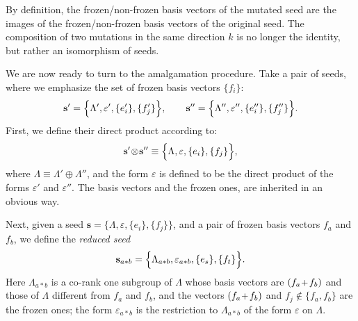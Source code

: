 \documentclass[12pt,hyperref,compress]{JHEP3}
\newcommand{\eq}[1]{\begin{equation}#1\end{equation}}
\newcommand{\pl}{\hspace{0.5pt}\text{{\small+}}\hspace{-0.5pt}}
\begin{document}
By definition, the frozen/non-frozen basis vectors of the mutated seed are the images of the  frozen/non-frozen basis vectors of the original seed. The composition of two mutations in the same direction $k$ is no longer the identity, but rather an isomorphism of seeds.

We are now ready to turn to the amalgamation procedure.
Take a pair of seeds, where we emphasize the set of frozen basis vectors $\{f_i\}$:
\vspace{-.2cm}\eq{{\mathbf s}' = \Big\{\Lambda', \varepsilon', \{e'_{i}\}, \{f'_{j}\}\Big\},\qquad{\mathbf s}'' = \Big\{\Lambda'', \varepsilon'', \{e''_{i}\}, \{f''_{j}\}\Big\}. \vspace{-.2cm} \label{thepair}}
First, we define their direct product according to:
\vspace{-.2cm}\eq{{\mathbf s}'\!\otimes\!{\mathbf s}''\equiv \Big\{\Lambda,\varepsilon, \{e_{i}\}, \{f_{j}\}\Big\},\vspace{-.2cm}}
where $\Lambda\!\equiv\!\Lambda'\!\oplus\!\Lambda''$, and the form $\varepsilon$ is defined to be the direct product of the forms $\varepsilon'$ and $\varepsilon''$. The basis vectors and the frozen ones, are inherited in an obvious way.

Next, given a seed ${\mathbf s} = \Big\{\Lambda,\varepsilon, \{e_{i}\}, \{f_{j}\}\Big\}$, and a pair of frozen basis vectors $f_a$ and $f_b$, we define the {\it reduced seed}
\vspace{-.2cm}\eq{{\mathbf s}_{a \ast  b} = \Big\{\Lambda_{a \ast  b}, \varepsilon_{a \ast  b}, \{e_{s}\}, \{f_{t}\}\Big\}.\vspace{-.2cm}}
Here $\Lambda_{a \ast  b}$ is a co-rank one subgroup of $\Lambda$ whose basis vectors are $(f_a\pl\,f_b)$ and those of $\Lambda$ different from $f_{a}$ and $f_b$, and the vectors  $(f_a\pl\,f_b)$ and $f_j\notin\{f_a,f_b\}$ are the frozen ones; the form $\varepsilon_{a \ast  b}$ is the restriction to $\Lambda_{a \ast  b}$ of the form $\varepsilon$ on $\Lambda$.
\end{document}
